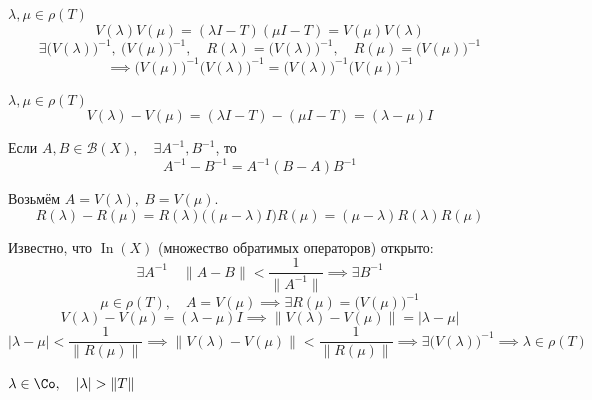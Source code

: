 \begin{eproof}
\item $ \lambda, \mu \in \rho(T) $
	$$ V(\lambda) V(\mu) = (\lambda I - T)(\mu I - T) = V(\mu) V(\lambda) $$
	$$ \exists \bigl( V(\lambda) \bigr)^{-1}, ~ \bigl( V(\mu) \bigr)^{-1}, \quad
	R(\lambda) = \bigl( V(\lambda) \bigr)^{-1}, \quad R(\mu) = \bigl( V(\mu) \bigr)^{-1} $$
	$$ \implies \bigl( V(\mu) \bigr)^{-1} \bigl( V(\lambda) \bigr)^{-1} =
	\bigl( V(\lambda) \bigr)^{-1} \bigl( V(\mu) \bigr)^{-1} $$
\item $ \lambda, \mu \in \rho(T) $
	$$ V(\lambda) - V(\mu) = (\lambda I - T) - (\mu I - T) = (\lambda - \mu) I $$

	Если $ A, B \in \mathscr B(X), \quad \exists A^{-1}, B^{-1} $, то
	$$ A^{-1} - B^{-1} = A^{-1}(B - A)B^{-1} $$

	Возьмём $ A = V(\lambda), ~ B = V(\mu) $.
	$$ R(\lambda) - R(\mu) = R(\lambda) \bigl( (\mu - \lambda) I \bigr) R(\mu) =
	(\mu - \lambda)R(\lambda)R(\mu) $$
\item Известно, что $ \operatorname{In}(X) $ (множество обратимых операторов) открыто:
	$$ \exists A^{-1} \quad \|A - B\| < \frac1{\|A^{-1}\|} \implies \exists B^{-1} $$
	$$ \mu \in \rho(T), \quad A = V(\mu) \implies \exists R(\mu) = \bigl( V(\mu) \bigr)^{-1} $$
	$$ V(\lambda) - V(\mu) = (\lambda - \mu)I \implies
	\|V(\lambda) - V(\mu)\| = |\lambda - \mu| $$
	$$ |\lambda - \mu| < \frac1{\|R(\mu)\|} \implies \|V(\lambda) - V(\mu) \| < \frac1{\|R(\mu)\|}
	\implies \exists \bigl( V(\lambda) \bigr)^{-1} \implies \lambda \in \rho(T) $$
\item $ \lambda \in \Co, \quad |\lambda| > \|T\| $


\end{eproof}
